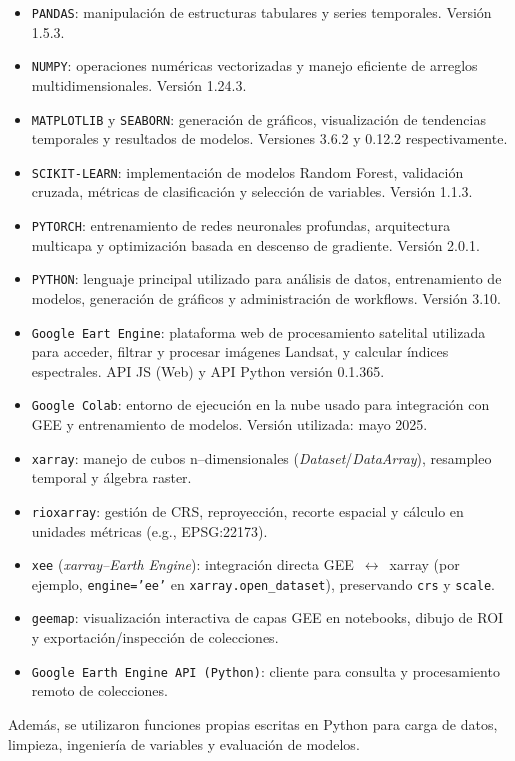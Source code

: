 \begin{itemize}
    \item \texttt{PANDAS}: manipulación de estructuras tabulares y series temporales. Versión 1.5.3.
    \item \texttt{NUMPY}: operaciones numéricas vectorizadas y manejo eficiente de arreglos multidimensionales. Versión 1.24.3.
    \item \texttt{MATPLOTLIB} y \texttt{SEABORN}: generación de gráficos, visualización de tendencias temporales y resultados de modelos. Versiones 3.6.2 y 0.12.2 respectivamente.
    \item \texttt{SCIKIT-LEARN}: implementación de modelos Random Forest, validación cruzada, métricas de clasificación y selección de variables. Versión 1.1.3.
    \item \texttt{PYTORCH}: entrenamiento de redes neuronales profundas, arquitectura multicapa y optimización basada en descenso de gradiente. Versión 2.0.1.
    \item \texttt{PYTHON}: lenguaje principal utilizado para análisis de datos, entrenamiento de modelos, generación de gráficos y administración de workflows. Versión 3.10.
    \item \texttt{Google Eart Engine}: plataforma web de procesamiento satelital utilizada para acceder, filtrar y procesar imágenes Landsat, y calcular índices espectrales. API JS (Web) y API Python versión 0.1.365.
    \item \texttt{Google Colab}: entorno de ejecución en la nube usado para integración con GEE y entrenamiento de modelos. Versión utilizada: mayo 2025.
    \item \texttt{xarray}: manejo de cubos n–dimensionales (\textit{Dataset}/\textit{DataArray}), resampleo temporal y álgebra raster.
    \item \texttt{rioxarray}: gestión de CRS, reproyección, recorte espacial y cálculo en unidades métricas (e.g., EPSG:22173).
    \item \texttt{xee} (\emph{xarray–Earth Engine}): integración directa GEE~$\leftrightarrow$~xarray (por ejemplo, \texttt{engine='ee'} en \texttt{xarray.open\_dataset}), preservando \texttt{crs} y \texttt{scale}.
    \item \texttt{geemap}: visualización interactiva de capas GEE en notebooks, dibujo de ROI y exportación/inspección de colecciones.
    \item \texttt{Google Earth Engine API (Python)}: cliente para consulta y procesamiento remoto de colecciones.
\end{itemize}



Además, se utilizaron funciones propias escritas en Python para carga de datos, limpieza, ingeniería de variables y evaluación de modelos.



